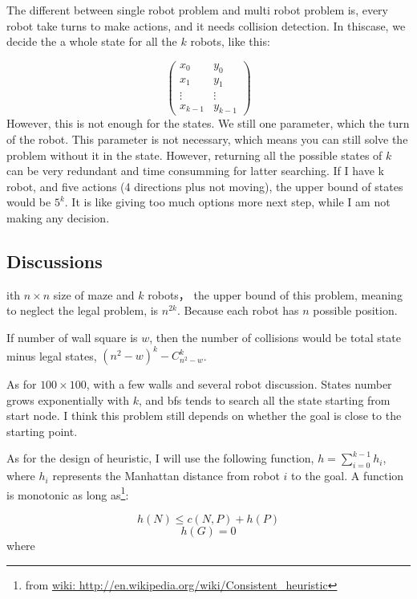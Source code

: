 \documentclass{article}
\begin{document}
The different between single robot problem and multi robot problem is, every robot take turns to make actions, and it needs collision detection. In thiscase, we decide the a whole state for all the $k$ robots, like this:



$$\begin{pmatrix}
x_0 & y_0 \\
x_1 & y_1 \\
\vdots & \vdots \\	
x_{k-1} & y_{k-1}
\end{pmatrix}$$
However, this is not enough for the states. We still one parameter, which the turn of the robot. This parameter is not necessary, which means you can still solve the problem without it in the state. However, returning all the possible states of $k$ can be very redundant and time consumming for latter searching. If I have k robot, and five actions (4 directions plus not moving), the upper bound of states would be $5^k$. It is like giving too much options more next step, while I am not making any decision.











\subsection{Discussions}
ith $n\times n$ size of maze and $k$ robots， the upper bound of this problem, meaning to neglect the legal problem, is $n^{2k}$. Because each robot has $n$ possible position.

If number of wall square is $w$, then the number of collisions would be total state minus legal states, $(n^2-w)^k - C_{n^2-w}^k$. 

As for $100\times100$, with a few walls and several robot discussion. States number grows exponentially with $k$, and bfs tends to search all the state starting from start node. I think this problem still depends on whether the goal is close to the starting point.

As for the design of heuristic, I will use the following function,
$h = \sum^{k-1}_{i=0}h_i$, where $h_i$ represents the Manhattan distance from robot $i$ to the goal. A function is monotonic as long as\footnote{from \url{wiki: http://en.wikipedia.org/wiki/Consistent_heuristic}}:

$$h(N) \leq c(N,P)+h(P) $$
$$h(G)=0$$
where
\end{document}

